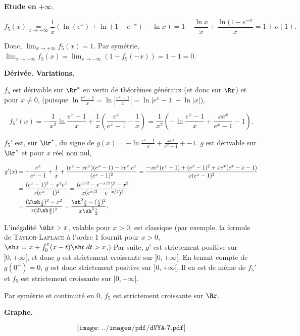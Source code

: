 {\begin{enumerate}
{{{{{\textbf{Etude en} $\bf{+{\infty}}$.

$$f_5(x)\underset{x\rightarrow+\infty}{=}\frac{1}{x}(\ln(e^x)+\ln(1-e^{-x})-\ln x)=1-\frac{\ln x}{x}+\frac{\ln(1-e^{-x}}{x}=1+o(1).$$

Donc, $\lim_{x\rightarrow +\infty}f_5(x)=1$. Par symétrie, $\lim_{x\rightarrow -\infty}f_5(x)=\lim_{x\rightarrow -\infty}(1-f_5(-x))=1-1=0$.

\textbf{Dérivée. Variations.}

$f_5$ est dérivable sur $\Rr^*$ en vertu de théorèmes généraux (et donc sur $\Rr$) et pour $x\neq 0$, (puisque $\ln\frac{e^x-1}{x}=\ln\left|\frac{e^x-1}{x}\right|=\ln|e^x-1|-\ln|x|$),

$$f_5'(x)=-\frac{1}{x^2}\ln\frac{e^x-1}{x}+\frac{1}{x}(\frac{e^x}{e^x-1}-\frac{1}{x})
=\frac{1}{x^2}(-\ln\frac{e^x-1}{x}+\frac{xe^x}{e^x-1}-1).$$

$f_5'$ est, sur $\Rr^*$, du signe de $g(x)=-\ln\frac{e^x-1}{x}+\frac{xe^x}{e^x-1}+-1$. $g$ est dérivable sur $\Rr^*$ et pour $x$ réel non nul,

\begin{align*}\ensuremath
g'(x)&=-\frac{e^x}{e^x-1}+\frac{1}{x}+\frac{(e^x+xe^x)(e^x-1)-xe^x.e^x}{(e^x-1)^2}
=\frac{-xe^x(e^x-1)+(e^x-1)^2+xe^x(e^x-x-1)}{x(e^x-1)^2}\\
 &=\frac{(e^x-1)^2-x^2e^x}{x(e^x-1)^2}=\frac{(e^{x/2}-e^{-x/2})^2-x^2}{x(e^{x/2}-e^{-x/2})^2}\\
 &=\frac{(2\sh\frac{x}{2})^2-x^2}{x(2\sh\frac{x}{2})^2}=\frac{\sh^2\frac{x}{2}-(\frac{x}{2})^2}{x\sh^2\frac{x}{2}}.
\end{align*} 
 
L'inégalité $\sh x>x$, valable pour $x>0$, est classique (par exemple, la formule de \textsc{Taylor}-\textsc{Laplace} à l'ordre 1 fournit pour $x>0$, $\sh x=x+\int_{0}^{x}(x-t)\sh t\;dt>x$.) Par suite, $g'$ est strictement positive sur $]0,+\infty[$, et donc $g$ est strictement croissante sur $]0,+\infty[$. En tenant compte de $g(0^+)= 0$, $g$ est donc strictement positive sur $]0,+\infty[$. Il en est de même de $f_5'$ et $f_5$ est strictement croissante sur $]0,+\infty[$.

Par symétrie et continuité en $0$, $f_5$ est strictement croissante sur $\Rr$.

\textbf{Graphe.}

$$\texttt{[image: ../images/pdf/dVYA-7.pdf]}$$


    \item {}
}}}}}
\end{enumerate}}
